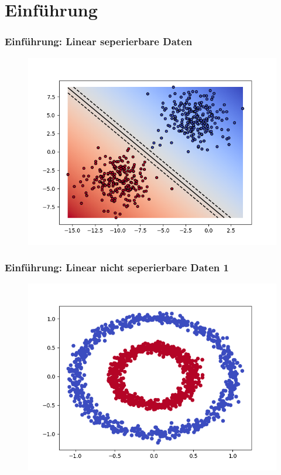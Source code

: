 \section{Einführung}
	\begin{frame}
		\frametitle{Einführung: Linear seperierbare Daten}
			\begin{figure}
					\includegraphics[width=\textwidth]{img/linearsvm.png}
			\end{figure}
	\end{frame}
	
	\begin{frame}
		\frametitle{Einführung: Linear nicht seperierbare Daten 1}
			\begin{figure}
					\includegraphics[width=\textwidth]{img/nonlinearsvm.png}
			\end{figure}
	\end{frame}
	
